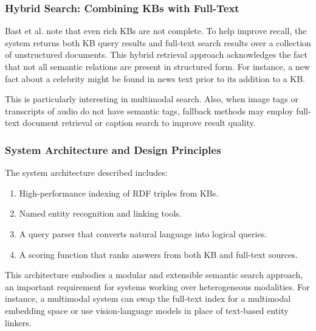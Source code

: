 \documentclass[conference]{IEEEtran}
\begin{document}
\subsubsection{Hybrid Search: Combining KBs with Full-Text}
Bast et al. note that even rich KBs are not complete. To help improve recall, the system returns both KB query results and full-text search results over a collection of unstructured documents. This hybrid retrieval approach acknowledges the fact that not all semantic relations are present in structured form. For instance, a new fact about a celebrity might be found in news text prior to its addition to a KB.

This is particularly interesting in multimodal search. Also, when image tags or transcripts of audio do not have semantic tags, fallback methods may employ full-text document retrieval or caption search to improve result quality.

\subsubsection{System Architecture and Design Principles}
The system architecture described includes:
\begin{enumerate}
    \item High-performance indexing of RDF triples from KBs.
    \item Named entity recognition and linking tools.
    \item A query parser that converts natural language into logical queries.
    \item A scoring function that ranks answers from both KB and full-text sources.
\end{enumerate}

This architecture embodies a modular and extensible semantic search approach, an important requirement for systems working over heterogeneous modalities. For instance, a multimodal system can swap the full-text index for a multimodal embedding space or use vision-language models in place of text-based entity linkers.
\end{document}
